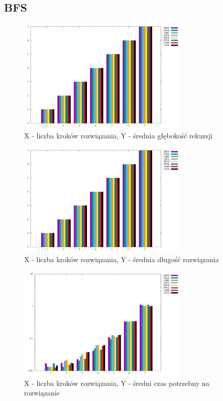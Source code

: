 \documentclass{classrep}
\begin{document}
{        \subsection{BFS}{
            \begin{figure}[!htbp]
                \centering
                \includegraphics[width=\textwidth, height=55mm]{img/BFS_depth.png}
                \caption{X - liczba kroków rozwiązania, Y - średnia głębokość rekursji}
                \label{BFS_depth}
            \end{figure}

            \begin{figure}[!htbp]
                \centering
                \includegraphics[width=\textwidth, height=55mm]{img/BFS_length.png}
                \caption{X - liczba kroków rozwiązania, Y - średnia długość rozwiązania}
                \label{BFS_length}
            \end{figure}

            \begin{figure}[!htbp]
                \centering
                \includegraphics[width=\textwidth, height=55mm]{img/BFS_time.png}
                \caption{X - liczba kroków rozwiązania, Y - średni czas potrzebny na rozwiązanie}
                \label{BFS_time}
            \end{figure}

}}
\end{document}
